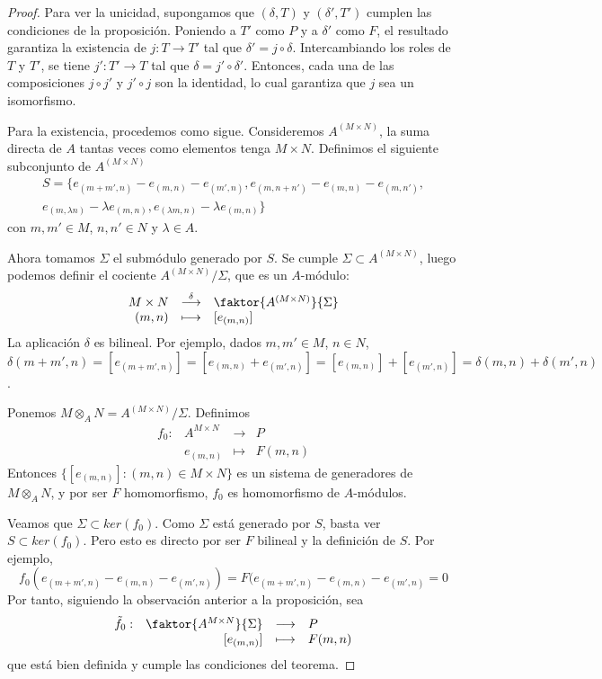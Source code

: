 \documentclass[../main.tex]{subfiles}
\begin{document}
\begin{proof}
Para ver la unicidad, supongamos que $(\delta,T)$ y $(\delta',T')$  cumplen las condiciones de la proposición. Poniendo a $T'$ como $P$ y a $\delta'$ como $F$, el resultado garantiza la existencia de $j:T\rightarrow T'$ tal que $\delta'=j\circ\delta$. Intercambiando los roles de $T$ y $T'$, se tiene $j':T'\rightarrow T$ tal que $\delta=j'\circ\delta'$. Entonces, cada una de las composiciones $j\circ j'$ y $j'\circ j$ son la identidad, lo cual garantiza que $j$ sea un isomorfismo.

Para la existencia, procedemos como sigue. Consideremos $A^{(M\times N)}$, la suma directa de $A$ tantas veces como elementos tenga $M\times N$. Definimos el siguiente subconjunto de $A^{(M\times N)}$
\begin{multline}
  S=\{e_{(m+m',n)}-e_{(m,n)}-e_{(m',n)}, e_{(m,n+n')}-e_{(m,n)}-e_{(m,n')}, \\ e_{(m,\lambda n)}-\lambda e_{(m,n)}, e_{(\lambda m,n)}-\lambda e_{(m,n)}\}
\end{multline}
con $m,m'\in M$, $n,n'\in N$ y $\lambda\in A$.

Ahora tomamos $\Sigma$ el submódulo generado por $S$. Se cumple $\Sigma\subset A^{(M\times N)}$, luego podemos definir el cociente $A^{(M\times N)}/\Sigma$, que es un $A$-módulo:
$$\begin{array}{rcl}
    M\times N&\overset{\delta}{\longrightarrow}&\faktor{A^{(M\times N)}}{\Sigma}\\
    (m,n)&\longmapsto&[e_{(m,n)}]
    \end{array}$$
La aplicación $\delta$ es bilineal. Por ejemplo, dados $m,m'\in M$, $n\in N$, $\delta(m+m',n)=[e_{(m+m',n)}]=[e_{(m,n)}+e_{(m',n)}]=[e_{(m,n)}]+[e_{(m',n)}]=\delta(m,n)+\delta(m',n)$.

Ponemos $M\otimes_A N=A^{(M\times N)}/\Sigma$. Definimos
$$\begin{array}{rrcl}
	f_0:&A^{M\times N}&\longrightarrow&P  \\
	&e_{(m,n)}&\longmapsto&F(m,n)
	\end{array}$$
Entonces $\{[e_{(m,n)}]: (m,n)\in M\times N\}$ es un sistema de generadores de $M\otimes_A N$, y por ser $F$ homomorfismo, $f_0$ es homomorfismo de $A$-módulos.

Veamos que $\Sigma\subset ker(f_0)$. Como $\Sigma$ está generado por $S$, basta ver $S\subset ker(f_0)$. Pero esto es directo por ser $F$ bilineal y la definición de $S$. Por ejemplo, $$f_0(e_{(m+m',n)}-e_{(m,n)}-e_{(m',n)})=F(e_{(m+m',n)}-e_{(m,n)}-e_{(m',n)}=0$$
Por tanto, siguiendo la observación anterior a la proposición, sea
$$\begin{array}{rrcl}
	\tilde{f_0}:&\faktor{A^{M\times N}}{\Sigma}&\longrightarrow&P  \\
	&[e_{(m,n)}]&\longmapsto&F(m,n)
	\end{array}$$
que está bien definida y cumple las condiciones del teorema.
\end{proof}
\end{document}
